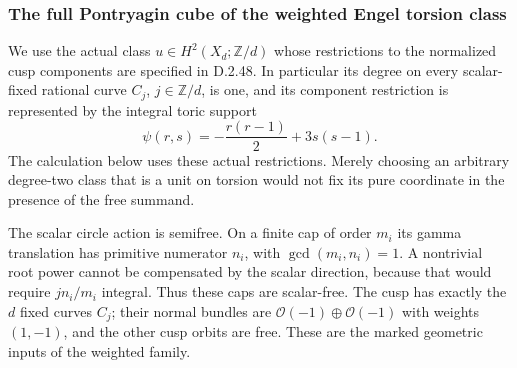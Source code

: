 \subsubsection*{The full Pontryagin cube of the weighted Engel torsion class}
We use the actual class $u\in H^2(X_d;\mathbb Z/d)$ whose
restrictions to the normalized cusp components are specified
in D.2.48. In particular its degree on every scalar-fixed
rational curve $C_j$, $j\in\mathbb Z/d$, is one, and its
component restriction is represented by the integral toric
support
\[
                  \psi(r,s)=-\frac{r(r-1)}2+3s(s-1).
                                                               \tag{D.TP1}
\]
The calculation below uses these actual restrictions. Merely
choosing an arbitrary degree-two class that is a unit on
torsion would not fix its pure coordinate in the presence
of the free summand.

The scalar circle action is semifree. On a finite cap of
order $m_i$ its gamma translation has primitive numerator
$n_i$, with $\gcd(m_i,n_i)=1$. A nontrivial root power cannot
be compensated by the scalar direction, because that would
require $j n_i/m_i$ integral. Thus these caps are scalar-free.
The cusp has exactly the $d$ fixed curves $C_j$; their normal
bundles are $\mathcal O(-1)\oplus\mathcal O(-1)$ with weights
$(1,-1)$, and the other cusp orbits are free. These are the
marked geometric inputs of the weighted family.

